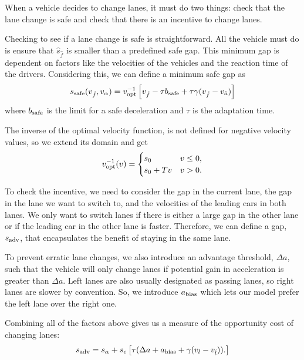 \documentclass[12pt]{article}
\begin{document}
      When a vehicle decides to change lanes, it must do two things: check that the lane change is safe and check that there is an incentive to change lanes.

      Checking to see if a lane change is safe is straightforward. All the vehicle must do is ensure that $\hat s_{\hat f}$ is smaller than a predefined safe gap. This minimum gap is dependent on factors like the velocities of the vehicles and the reaction time of the drivers. 
      Considering this, we can define a minimum safe gap as 
      \begin{equation}
        s_{\rm safe} (v_{\hat f}, v_{\alpha}) = v_{\rm opt}^{-1} \left[v_{\hat f} -\tau b_{\rm safe} + \tau \gamma (v_{\hat f} - v_{\hat a}) \right]
      \end{equation}
      where $b_{\rm safe}$ is the limit for a safe deceleration and $\tau$ is the adaptation time. 

      The inverse of the optimal velocity function, is not defined for negative velocity values, so we extend its domain and get
      \begin{equation}
        v_{\rm opt}^{-1}(v) = \begin{cases}
          s_0 & v \leq 0,\\
          s_0 + Tv & v > 0.\\
        \end{cases}
      \end{equation}

      To check the incentive, we need to consider the gap in the current lane, the gap in the lane we want to switch to, and the velocities of the leading cars in both lanes. We only want to switch lanes if there is either a large gap in the other lane or if the leading car in the other lane is faster. Therefore, we can define a gap, $s_{\rm adv}$, that encapsulates the benefit of staying in the same lane. 
      
      To prevent erratic lane changes, we also introduce an advantage threshold, $\Delta a$, such that the vehicle will only change lanes if potential gain in acceleration is greater than $\Delta a$.  Left lanes are also usually designated as passing lanes, so right lanes are slower by convention. So, we introduce $a_{\rm bias}$ which lets our model prefer the left lane over the right one. 
      
      Combining all of the factors above gives us a measure of the opportunity cost of changing lanes:
      \begin{equation}
        s_{\rm adv} = s_{\alpha} + s_e\left[\tau(\Delta a + a_{\rm bias} + \gamma(v_l - v_{\hat l})).\right]
      \end{equation}
\end{document}
